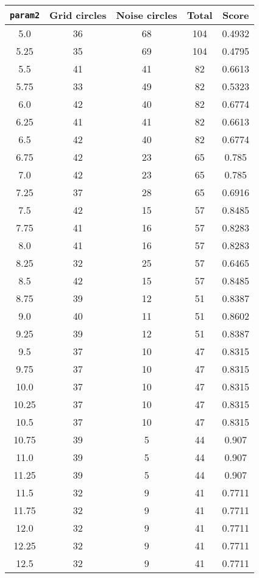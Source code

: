 \documentclass[letterpaper, 12pt]{article}
\begin{document}
\begin{longtable}{|c|c|c|c|c|}
\hline
\textbf{\texttt{param2}} & \textbf{Grid circles} & \textbf{Noise circles} & \textbf{Total} & \textbf{Score} \\
\hline
5.0 & 36 & 68 & 104 & 0.4932 \\
\hline
5.25 & 35 & 69 & 104 & 0.4795 \\
\hline
5.5 & 41 & 41 & 82 & 0.6613 \\
\hline
5.75 & 33 & 49 & 82 & 0.5323 \\
\hline
6.0 & 42 & 40 & 82 & 0.6774 \\
\hline
6.25 & 41 & 41 & 82 & 0.6613 \\
\hline
6.5 & 42 & 40 & 82 & 0.6774 \\
\hline
6.75 & 42 & 23 & 65 & 0.785 \\
\hline
7.0 & 42 & 23 & 65 & 0.785 \\
\hline
7.25 & 37 & 28 & 65 & 0.6916 \\
\hline
7.5 & 42 & 15 & 57 & 0.8485 \\
\hline
7.75 & 41 & 16 & 57 & 0.8283 \\
\hline
8.0 & 41 & 16 & 57 & 0.8283 \\
\hline
8.25 & 32 & 25 & 57 & 0.6465 \\
\hline
8.5 & 42 & 15 & 57 & 0.8485 \\
\hline
8.75 & 39 & 12 & 51 & 0.8387 \\
\hline
9.0 & 40 & 11 & 51 & 0.8602 \\
\hline
9.25 & 39 & 12 & 51 & 0.8387 \\
\hline
9.5 & 37 & 10 & 47 & 0.8315 \\
\hline
9.75 & 37 & 10 & 47 & 0.8315 \\
\hline
10.0 & 37 & 10 & 47 & 0.8315 \\
\hline
10.25 & 37 & 10 & 47 & 0.8315 \\
\hline
10.5 & 37 & 10 & 47 & 0.8315 \\
\hline
10.75 & 39 & 5 & 44 & 0.907 \\
\hline
11.0 & 39 & 5 & 44 & 0.907 \\
\hline
11.25 & 39 & 5 & 44 & 0.907 \\
\hline
11.5 & 32 & 9 & 41 & 0.7711 \\
\hline
11.75 & 32 & 9 & 41 & 0.7711 \\
\hline
12.0 & 32 & 9 & 41 & 0.7711 \\
\hline
12.25 & 32 & 9 & 41 & 0.7711 \\
\hline
12.5 & 32 & 9 & 41 & 0.7711 \\

\end{longtable}
\end{document}
